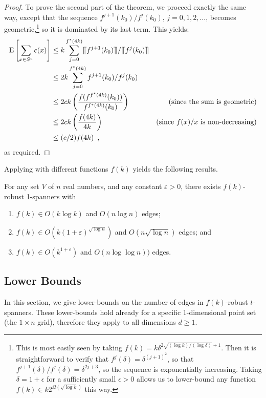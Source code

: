 \documentclass{patmorin}
\newcommand{\eps}{\varepsilon}
\begin{document}
\begin{proof}
  To prove the second part of the theorem, we proceed exactly the same
  way, except that the sequence $f^{j+1}(k_0)/f^j(k_0)$,
  $j=0,1,2,\ldots$, becomes
  geometric,\footnote{This is most easily seen by taking $f(k)
  = k\delta^{2\sqrt{(\log k)/(\log\delta)}+1}$.  Then it is
  straightforward to verify that $f^j(\delta) = \delta^{(j+1)^2}$, so
  that $f^{j+1}(\delta)/f^j(\delta)= \delta^{2j+3}$, so the sequence
  is exponentially increasing.  Taking $\delta = 1+\epsilon$ for a
  sufficiently small $\epsilon>0$ allows us to lower-bound any function
  $f(k)\in k2^{\Omega(\sqrt{\log k})}$ this way.} so it is dominated by
  its last term.  This yields:
  \begin{align*}
  \mathrm{E}\left[\sum_{x\in S^c} c(x)\right] 
      & \le  k \sum_{j=0}^{f^*(4k)} \llceil f^{j+1}(k_0)\rrceil/\llceil f^j(k_0)\rrceil \\
      & \le  2k \sum_{j=0}^{f^*(4k)} f^{j+1}(k_0)/f^j(k_0) \\
      & \le  2ck\left(\frac{f(f^{f^*(4k)}(k_0))}{f^{f^*(4k)}(k_0)}\right) 
            & \text{(since the sum is geometric)} \\
      & \le  2ck\left(\frac{f(4k)}{4k}\right) 
            & \text{(since $f(x)/x$ is non-decreasing)} \\
      & \le  (c/2)f(4k) \enspace ,
  \end{align*}
  as required.
\end{proof}


Applying  with different functions $f(k)$ yields the
following results.
\begin{cor}
  For any set $V$ of $n$ real numbers, and any constant $\eps >0$,
  there exists $f(k)$-robust 1-spanners with
  \begin{enumerate}
    \item $f(k)\in O(k\log k)$ and $O(n\log n)$ edges;
    \item $f(k)\in O(k(1+\eps)^{\sqrt{\log n}})$ and $O(n\sqrt{\log n})$
      edges; and
    \item $f(k)\in O(k^{1+\eps})$ and $O(n\log\log n))$ edges.
  \end{enumerate}
\end{cor}


\subsection{Lower Bounds}

In this section, we give lower-bounds on the number of edges in
$f(k)$-robust $t$-spanners.  These lower-bounds hold already for a
specific 1-dimensional point set (the $1\times n$ grid), therefore they
apply to all dimensions $d\ge 1$.
\end{document}
